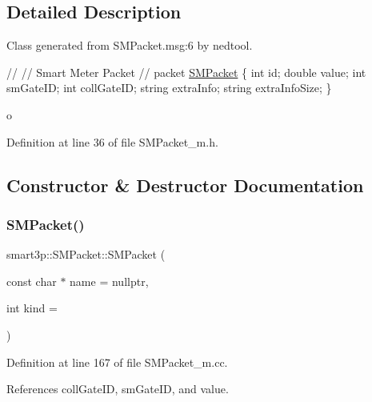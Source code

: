 \subsection{Detailed Description}
Class generated from {\ttfamily S\+M\+Packet.\+msg\+:6} by nedtool. 
\begin{DoxyPre}
   //
   // Smart Meter Packet
   //
   packet \hyperlink{classsmart3p_1_1SMPacket}{SMPacket}
   \{
       int id;
       double value;
       int smGateID;
       int collGateID;
       string extraInfo;
       string extraInfoSize;
   \}
   \end{DoxyPre}
 o 

Definition at line 36 of file S\+M\+Packet\+\_\+m.\+h.



\subsection{Constructor \& Destructor Documentation}
\mbox{\label{classsmart3p_1_1SMPacket_a096748da42a5fce6a6947268987c1a62}} 
\subsubsection{\texorpdfstring{S\+M\+Packet()}{SMPacket()}\hspace{0.1cm}{\footnotesize\ttfamily [1/2]}}
{\footnotesize\ttfamily smart3p\+::\+S\+M\+Packet\+::\+S\+M\+Packet (\begin{DoxyParamCaption}\item[{const char $\ast$}]{name = {\ttfamily nullptr},  }\item[{int}]{kind = {} }\end{DoxyParamCaption})}



Definition at line 167 of file S\+M\+Packet\+\_\+m.\+cc.



References coll\+Gate\+ID, sm\+Gate\+ID, and value.

\mbox{\label{classsmart3p_1_1SMPacket_ab998efe53cce923572c1ca4d147fef57}} 
